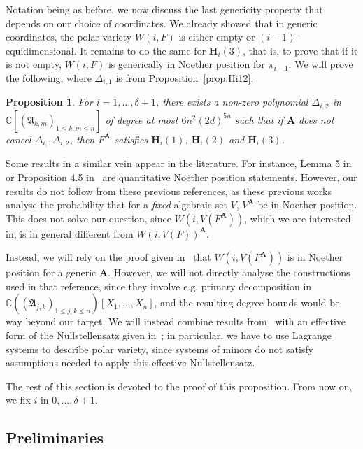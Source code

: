 \documentclass[12pt]{article}
\def\A{\mathfrak{A}}
\def\mA{{\bm A}}
\def\D{\Delta}
\def\C{\mathbb{C}}
\newtheorem{prop}[theorem]{Proposition}
\begin{document}
Notation being as before, we now discuss the last genericity property
that depends on our choice of coordinates. We already showed that in
generic coordinates, the polar variety $W(i, F)$ is either empty or
$(i-1)$-equidimensional. It remains to do the same for $\bm H_i(3)$, 
that is, to prove that if it is not empty, $W(i, F)$ is generically in Noether
position for $\pi_{i-1}$. We will prove the following, where $\D_{i,1}$ is
from Proposition~\ref{prop:Hi12}.
\begin{prop}\label{prop:Hi123}
  For $i=1,\dots,\delta+1$, there exists a non-zero polynomial
  $\D_{i,2}$ in $\C[(\A_{k,m})_{1 \le k,m \le n}]$ of degree at most
  $6n^2(2d)^{5n}$ such that if $\mA$ does not cancel $\D_{i,1}
  \D_{i,2}$, then $F^{\mA}$ satisfies $\bm H_i(1)$, $\bm H_i(2)$ and
  $\bm H_i(3)$.
\end{prop}
Some results in a similar vein appear in the literature. For instance,
Lemma 5 in~\cite{JeSa10} or Proposition 4.5
in~\cite{SharpEstimatesForTheEffectiveN} are quantitative Noether
position statements. However, our results do not follow from these
previous references, as these previous works analyse the probability
that for a {\em fixed} algebraic set $V$, $V^\mA$ be in Noether
position.  This does not solve our question, since
$W(i,V(F^\mA))$, which we are interested in, is in general
different from $W(i,V(F))^\mA$.

Instead, we will rely on the proof given in~\cite{EMP} that
$W(i,V(F^\mA))$ is in Noether position for a generic $\mA$.  However,
we will not directly analyse the constructions used in that reference,
since they involve e.g. primary decomposition in $\C((\A_{j,k})_{1 \le
  j,k \le n})[X_1,\dots,X_n]$, and the resulting degree bounds would
be way beyond our target. We will instead combine results
from~\cite{EMP} with an effective form of the Nullstellensatz given
in~\cite{EN}; in particular, we have to use Lagrange systems to
describe polar variety, since systems of minors do not satisfy
assumptions needed to apply this effective Nullstellensatz.
 
The rest of this section is devoted to the proof of this proposition.
From now on, we fix $i$ in $0,\dots,\delta+1$.


\subsection{Preliminaries}
\end{document}
